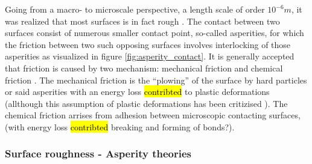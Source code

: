 Going from a macro- to microscale perspective, a length scale of order $10^{-6} m$, it was realized that most surfaces is in fact rough \cite{mo_friction_2009}. The contact between two surfaces consist of
numerous smaller contact point, so-called asperities, for which the friction
between two such opposing surfaces involves interlocking of those asperities as visualized in figure \ref{fig:asperity_contact}. It is generally accepted that friction is caused by two mechanism: mechanical friction and chemical friction \cite{kim_nano-scale_2009}. The mechanical friction is the ``plowing'' of the surface by hard particles or said asperities with an energy loss \hl{contribted} to plastic deformations (allthough this assumption of plastic deformations has been critizised \cite{CARBONE20082555}). The chemical friction arrises from adhesion between microscopic contacting surfaces, (with energy loss \hl{contribted} breaking and forming of bonds?).












\subsubsection{Surface roughness - Asperity theories}

